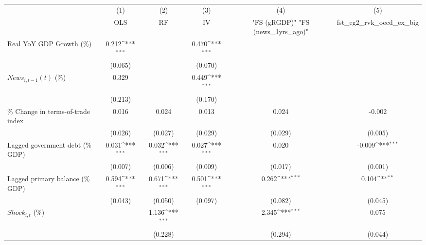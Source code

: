 {
\def\sym#1{\ifmmode^{#1}\else\(^{#1}\)\fi}
\begin{tabular}{l*{5}{c}}
\toprule
                    &\multicolumn{1}{c}{(1)}&\multicolumn{1}{c}{(2)}&\multicolumn{1}{c}{(3)}&\multicolumn{1}{c}{(4)}&\multicolumn{1}{c}{(5)}\\
                    &\multicolumn{1}{c}{OLS}&\multicolumn{1}{c}{RF}&\multicolumn{1}{c}{IV}&\multicolumn{1}{c}{ "FS (gRGDP)"  "FS (news_1yrs_ago)" }&\multicolumn{1}{c}{fst_eg2_rvk_oecd_ex_big}\\
\midrule
Real YoY GDP Growth (\%)&       0.212\sym{***}&                     &       0.470\sym{***}&                     &                     \\
                    &     (0.065)         &                     &     (0.070)         &                     &                     \\
\addlinespace
$ News_{i,t-1}(t)$ (\%)&       0.329         &                     &       0.449\sym{***}&                     &                     \\
                    &     (0.213)         &                     &     (0.170)         &                     &                     \\
\addlinespace
\% Change in terms-of-trade index&       0.016         &       0.024         &       0.013         &       0.024         &      -0.002         \\
                    &     (0.026)         &     (0.027)         &     (0.029)         &     (0.029)         &     (0.005)         \\
\addlinespace
Lagged government debt (\% GDP)&       0.031\sym{***}&       0.032\sym{***}&       0.027\sym{***}&       0.020         &      -0.009\sym{***}\\
                    &     (0.007)         &     (0.006)         &     (0.009)         &     (0.017)         &     (0.001)         \\
\addlinespace
Lagged primary balance (\% GDP)&       0.594\sym{***}&       0.671\sym{***}&       0.501\sym{***}&       0.262\sym{***}&       0.104\sym{**} \\
                    &     (0.043)         &     (0.050)         &     (0.097)         &     (0.082)         &     (0.045)         \\
\addlinespace
$ Shock_{i,t}$ (\%) &                     &       1.136\sym{***}&                     &       2.345\sym{***}&       0.075         \\
                    &                     &     (0.228)         &                     &     (0.294)         &     (0.044)         \\

\end{tabular}}
